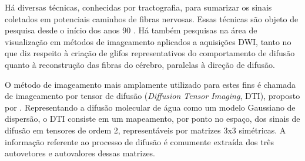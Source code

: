 \documentclass[
    12pt,                %
    oneside,            %
    a4paper,            %
    english,            %
    french,                %
    spanish,            %
    brazil                %
    ]{abntex2}
\begin{document}





Há diversas técnicas, conhecidas por tractografia, para sumarizar os sinais coletados em potenciais caminhos de fibras nervosas. Essas técnicas são objeto de pesquisa desde o início dos anos 90 \cite{descoteaux2015}. Há também pesquisas na área de visualização em métodos de imageamento aplicados a aquisições DWI, tanto no que diz respeito à criação de glifos representativos do comportamento de difusão quanto à reconstrução das fibras do cérebro, paralelas à direção de difusão.

O método de imageamento mais amplamente utilizado para estes fins é chamada de imageamento por tensor de difusão (\textit{Diffusion Tensor Imaging}, DTI), proposto por . Representando a difusão molecular de água como um modelo Gaussiano de dispersão, o DTI consiste em um mapeamento, por ponto no espaço, dos sinais de difusão em tensores de ordem 2, representáveis por matrizes 3x3 simétricas. A informação referente ao processo de difusão é comumente extraída dos três autovetores e autovalores dessas matrizes.
\end{document}
